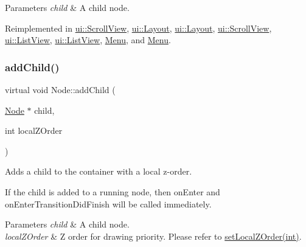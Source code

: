 \begin{DoxyParams}{Parameters}
{\em child} & A child node. \\
\hline
\end{DoxyParams}


Reimplemented in \hyperlink{classui_1_1ScrollView_a33a556579ca4e24b016a787af18cfcae}{ui\+::\+Scroll\+View}, \hyperlink{classui_1_1Layout_ae08449caf813144448cc3841b1a6dfee}{ui\+::\+Layout}, \hyperlink{classui_1_1Layout_a5d22ede0db71db1d5b597207f1c2013e}{ui\+::\+Layout}, \hyperlink{classui_1_1ScrollView_a6cdee934880e71245c6f5e6a2789c48a}{ui\+::\+Scroll\+View}, \hyperlink{classui_1_1ListView_a7fb7f42f3f3ee9e9ca8ee3bb959e2c32}{ui\+::\+List\+View}, \hyperlink{classui_1_1ListView_aeee2116f21f0e89de5a2e1b9cc93e012}{ui\+::\+List\+View}, \hyperlink{classMenu_af957ef275f6fe75ee78876cbbea924e8}{Menu}, and \hyperlink{classMenu_af557403e8b14bdbda70d85b7d12fedfb}{Menu}.

\mbox{\label{classNode_a4fc01f017ee724751b48ec3c6fd60df3}} 
\subsubsection{\texorpdfstring{add\+Child()}{addChild()}\hspace{0.1cm}{\footnotesize\ttfamily [4/8]}}
{\footnotesize\ttfamily virtual void Node\+::add\+Child (\begin{DoxyParamCaption}\item[{\hyperlink{classNode}{Node} $\ast$}]{child,  }\item[{int}]{local\+Z\+Order }\end{DoxyParamCaption})\hspace{0.3cm}{\ttfamily [virtual]}}

Adds a child to the container with a local z-\/order.

If the child is added to a \textquotesingle{}running\textquotesingle{} node, then \textquotesingle{}on\+Enter\textquotesingle{} and \textquotesingle{}on\+Enter\+Transition\+Did\+Finish\textquotesingle{} will be called immediately.


\begin{DoxyParams}{Parameters}
{\em child} & A child node. \\
\hline
{\em local\+Z\+Order} & Z order for drawing priority. Please refer to {\ttfamily \hyperlink{classNode_aee4e616c2d55b722226aae1e68b4946f}{set\+Local\+Z\+Order(int)}}. \\
\hline
\end{DoxyParams}


